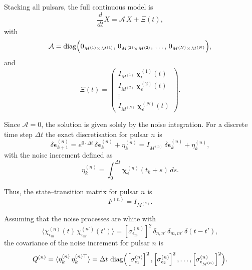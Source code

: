 \documentclass{tufte-handout} %
\begin{document}
Stacking all pulsars, the full continuous model is
\begin{equation}
\frac{d}{dt}X = \mathcal{A}\,X + \Xi(t),
\end{equation}
with
\begin{equation}
\mathcal{A} = \operatorname{diag}\Bigl(0_{M^{(1)}\times M^{(1)}},\,0_{M^{(2)}\times M^{(2)}},\,\dots,\,0_{M^{(N)}\times M^{(N)}}\Bigr),
\end{equation}
and
\begin{equation}
\Xi(t)= \begin{pmatrix}
I_{M^{(1)}}\,\boldsymbol{\chi}_\epsilon^{(1)}(t) \\
I_{M^{(2)}}\,\boldsymbol{\chi}_\epsilon^{(2)}(t) \\
\vdots \\
I_{M^{(N)}}\,\boldsymbol{\chi}_\epsilon^{(N)}(t)
\end{pmatrix}.
\end{equation}

Since \(\mathcal{A}=0\), the solution is given solely by the noise integration. For a discrete time step \(\Delta t\) the exact discretisation for pulsar \(n\) is
\begin{equation}
\delta\boldsymbol{\epsilon}^{(n)}_{k+1} = e^{0\cdot \Delta t}\,\delta\boldsymbol{\epsilon}^{(n)}_k + \eta_k^{(n)} = I_{M^{(n)}}\,\delta\boldsymbol{\epsilon}^{(n)}_k + \eta_k^{(n)},
\end{equation}
with the noise increment defined as
\begin{equation}
\eta_k^{(n)} = \int_0^{\Delta t}\boldsymbol{\chi}_\epsilon^{(n)}(t_k+s)\,ds.
\end{equation}

Thus, the state--transition matrix for pulsar \(n\) is
\begin{equation}
F^{(n)} = I_{M^{(n)}}.
\end{equation}

Assuming that the noise processes are white with
\begin{equation}
\langle \chi_{\epsilon_m}^{(n)}(t)\,\chi_{\epsilon_{m'}}^{(n')}(t') \rangle 
= \left[\sigma_{\epsilon_m}^{(n)}\right]^2\,\delta_{n,n'}\,\delta_{m,m'}\,\delta(t-t'),
\end{equation}
the covariance of the noise increment for pulsar \(n\) is
\begin{equation}
Q^{(n)} = \langle \eta_k^{(n)}\,\eta_k^{(n)\top} \rangle 
= \Delta t\,\operatorname{diag}\Bigl(\left[\sigma_{\epsilon_1}^{(n)}\right]^2,\left[\sigma_{\epsilon_2}^{(n)}\right]^2,\dots,\left[\sigma_{\epsilon_{M^{(n)}}}^{(n)}\right]^2\Bigr).
\end{equation}
\end{document}
